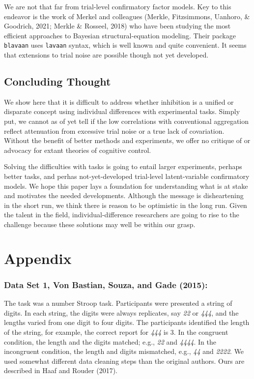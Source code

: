 \documentclass[
  ,man]{apa6}
\begin{document}
We are not that far from trial-level confirmatory factor models. Key to this endeavor is the work of Merkel and colleagues (Merkle, Fitzsimmons, Uanhoro, \& Goodrich, 2021; Merkle \& Rosseel, 2018) who have been studying the most efficient approaches to Bayesian structural-equation modeling. Their package \texttt{blavaan} uses \texttt{lavaan} syntax, which is well known and quite convenient. It seems that extensions to trial noise are possible though not yet developed.

\hypertarget{concluding-thought}{%
\subsection{Concluding Thought}\label{concluding-thought}}

We show here that it is difficult to address whether inhibition is a unified or disparate concept using individual differences with experimental tasks. Simply put, we cannot as of yet tell if the low correlations with conventional aggregation reflect attenuation from excessive trial noise or a true lack of covariation. Without the benefit of better methods and experiments, we offer no critique of or advocacy for extant theories of cognitive control.

Solving the difficulties with tasks is going to entail larger experiments, perhaps better tasks, and perhas not-yet-developed trial-level latent-variable confirmatory models. We hope this paper lays a foundation for understanding what is at stake and motivates the needed developments. Although the message is disheartening in the short run, we think there is reason to be optimistic in the long run. Given the talent in the field, individual-difference researchers are going to rise to the challenge because these solutions may well be within our grasp.

\newpage

\hypertarget{appendix}{%
\section{Appendix}\label{appendix}}

\hypertarget{data-set-1-vonbastian.etal.2015}{%
\subsubsection{Data Set 1, Von Bastian, Souza, and Gade (2015):}\label{data-set-1-vonbastian.etal.2015}}

The task was a number Stroop task. Participants were presented a string of digits. In each string, the digits were always replicates, say \emph{22} or \emph{444}, and the lengths varied from one digit to four digits. The participants identified the length of the string, for example, the correct report for \emph{444} is 3. In the congruent condition, the length and the digits matched; e.g., \emph{22} and \emph{4444}. In the incongruent condition, the length and digits mismatched, e.g., \emph{44} and \emph{2222}. We used somewhat different data cleaning steps than the original authors. Ours are described in Haaf and Rouder (2017).
\end{document}
